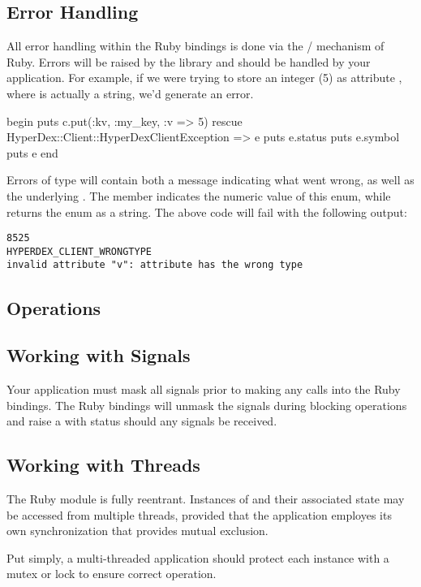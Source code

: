 \subsection{Error Handling}
\label{sec:api:ruby:error-handling}

All error handling within the Ruby bindings is done via the
/ mechanism of Ruby.  Errors will be raised by the
library and should be handled by your application.  For example, if we were
trying to store an integer (5) as attribute , where  is
actually a string, we'd generate an error.

\begin{rubycode}
begin
    puts c.put(:kv, :my_key, {:v => 5})
rescue HyperDex::Client::HyperDexClientException => e
    puts e.status
    puts e.symbol
    puts e
end
\end{rubycode}

Errors of type  will contain both a message
indicating what went wrong, as well as the underlying .  The member  indicates the numeric
value of this enum, while  returns the enum as a string.  The above
code will fail with the following output:

\begin{verbatim}
8525
HYPERDEX_CLIENT_WRONGTYPE
invalid attribute "v": attribute has the wrong type
\end{verbatim}

\subsection{Operations}
\label{sec:api:ruby:ops}



\subsection{Working with Signals}
\label{sec:api:ruby:signals}

Your application must mask all signals prior to making any calls into the
Ruby bindings.  The Ruby bindings will unmask the signals during blocking
operations and raise a  with status
 should any signals be received.

\subsection{Working with Threads}
\label{sec:api:ruby:threads}

The Ruby module is fully reentrant.  Instances of
 and their associated state may be accessed from
multiple threads, provided that the application employes its own synchronization
that provides mutual exclusion.

Put simply, a multi-threaded application should protect each 
instance with a mutex or lock to ensure correct operation.

